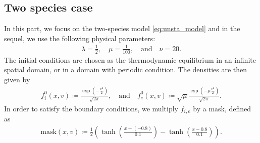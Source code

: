\documentclass{article}
\numberwithin{equation}{section}
\begin{document}
\subsection{Two species case} %
In this part, we focus on the two-species model \eqref{eq:unsta_model} 
and in the sequel, we use the following physical parameters:
\begin{align}\label{eq:param_simu}
	\lambda = \frac{1}{2}, \quad \mu = \frac{1}{100}, \quad\text{and}\quad \nu = 20.
\end{align}
The initial conditions are chosen as the thermodynamic equilibrium in an infinite spatial domain, or in a domain with periodic condition. The densities are then given by
\begin{align*}
	f_{i}^0 (x,v) \coloneqq \frac{\exp\left(- \frac{v^2}{2}\right)}{\sqrt{2\pi}}, \quad \text{and} \quad f_{e}^0 (x,v) \coloneqq \sqrt{\mu}\frac{\exp\left(- \mu \frac{v^2}{2}\right)}{\sqrt{2\pi}}.
\end{align*}
In order to satisfy the boundary conditions, we multiply $f_{i,e}$ by a mask, defined as
\begin{align*}
	\text{mask}(x,v) \coloneqq \frac{1}{2} \left(\tanh\left(\frac{x - (-0.8)}{0.1}\right) - \tanh\left(\frac{x - 0.8}{0.1}\right)\right).
\end{align*}
\end{document}
